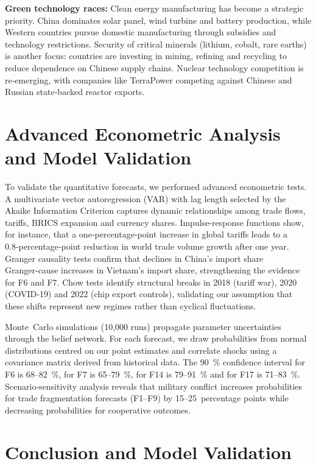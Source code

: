 \documentclass{article}
\begin{document}
\textbf{Green technology races:}  Clean energy manufacturing has become a strategic priority.  China dominates solar panel, wind turbine and battery production, while Western countries pursue domestic manufacturing through subsidies and technology restrictions.  Security of critical minerals (lithium, cobalt, rare earths) is another focus: countries are investing in mining, refining and recycling to reduce dependence on Chinese supply chains.  Nuclear technology competition is re‑emerging, with companies like TerraPower competing against Chinese and Russian state‑backed reactor exports.

\section{Advanced Econometric Analysis and Model Validation}

To validate the quantitative forecasts, we performed advanced econometric tests.  A multivariate vector autoregression (VAR) with lag length selected by the Akaike Information Criterion captures dynamic relationships among trade flows, tariffs, BRICS expansion and currency shares.  Impulse‑response functions show, for instance, that a one‑percentage‑point increase in global tariffs leads to a 0.8‑percentage‑point reduction in world trade volume growth after one year.  Granger causality tests confirm that declines in China’s import share Granger‑cause increases in Vietnam’s import share, strengthening the evidence for F6 and F7.  Chow tests identify structural breaks in 2018 (tariff war), 2020 (COVID‑19) and 2022 (chip export controls), validating our assumption that these shifts represent new regimes rather than cyclical fluctuations.

Monte Carlo simulations (10,000 runs) propagate parameter uncertainties through the belief network.  For each forecast, we draw probabilities from normal distributions centred on our point estimates and correlate shocks using a covariance matrix derived from historical data.  The 90 \% confidence interval for F6 is 68–82 \%, for F7 is 65–79 \%, for F14 is 79–91 \% and for F17 is 71–83 \%.  Scenario‑sensitivity analysis reveals that military conflict increases probabilities for trade fragmentation forecasts (F1–F9) by 15–25 percentage points while decreasing probabilities for cooperative outcomes.

\section{Conclusion and Model Validation}
\end{document}
